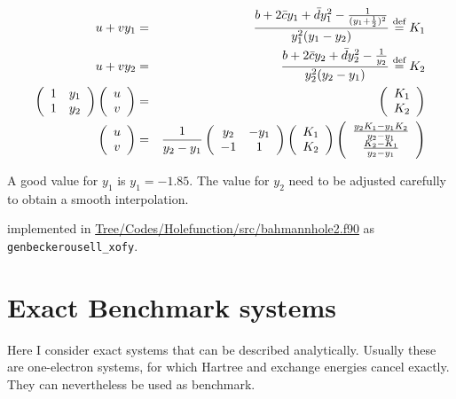 \documentclass[11pt,a4paper]{report}
\begin{document}
\begin{eqnarray}
u+vy_1&=&\frac{b+2\bar{c}y_1+\bar{d}y_1^2-\frac{1}{(y_1+\frac{1}{2})^2}}
{y_1^2(y_1-y_2)}\stackrel{\text{def}}{=} K_1
\nonumber\\
u+vy_2&=&\frac{b+2\bar{c}y_2+\bar{d}y_2^2
-\frac{1}{y_2}}{y_2^2(y_2-y_1)}\stackrel{\text{def}}{=} K_2
\nonumber\\
\left(\begin{array}{cc} 1 & y_1\\1& y_2\end{array}\right)
\left(\begin{array}{c} u \\v\end{array}\right)
&=&
\left(\begin{array}{c} K_1\\K_2\end{array}\right)
\nonumber\\
\left(\begin{array}{c} u \\v\end{array}\right)
&=&
\frac{1}{y_2-y_1}\left(\begin{array}{cc} y_2 & -y_1\\-1& 1\end{array}\right)
\left(\begin{array}{c} K_1\\K_2\end{array}\right)
\left(\begin{array}{c} 
\frac{y_2K_1-y_1K_2}{y_2-y_1}\\
\frac{K_2-K_1}{y_2-y_1}
\end{array}\right)
\end{eqnarray}

A good value for $y_1$ is $y_1=-1.85$. The value for $y_2$ need to be
adjusted carefully to obtain a smooth interpolation.

implemented in \url{Tree/Codes/Holefunction/src/bahmannhole2.f90}
as \verb|genbeckerousell_xofy|.


\chapter{Exact Benchmark systems}
Here I consider exact systems that can be described analytically.
Usually these are one-electron systems, for which Hartree and exchange
energies cancel exactly. They can nevertheless be used as benchmark.
\end{document}

